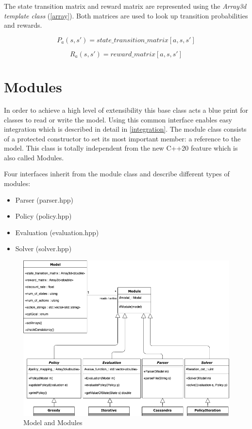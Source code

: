 The state transition matrix and reward matrix are represented using the \emph{Array3d template class} (\autoref{array}).
Both matrices are used to look up transition probabilities and rewards.

\begin{equation}
P_a(s,s') = state\_transition\_matrix[a,s,s']
\end{equation}

\begin{equation}
R_a(s,s') = reward\_matrix[a,s,s']
\end{equation}



\section{Modules}
\label{chaptermodule}

In order to achieve a high level of extensibility this base class acts a blue print for classes to read or write the model. Using this common interface enables easy integration which is described in detail in \autoref{integration}. The module class consists of a protected constructor to set its most important member: a reference to the model. This class is totally independent from the new C++20 feature which is also called Modules. 

Four interfaces inherit from the module class and describe different types of modules:

\begin{itemize}
	\item Parser (parser.hpp)
	\item Policy (policy.hpp)
	\item Evaluation (evaluation.hpp)
	\item Solver (solver.hpp)
\end{itemize}

\begin{figure}[ht]
	\centering
	\includegraphics[width=.9\textwidth]{images/Modules.png}
	\caption{\label{fig:bild2}Model and Modules}
	\label{Modules}
\end{figure}

